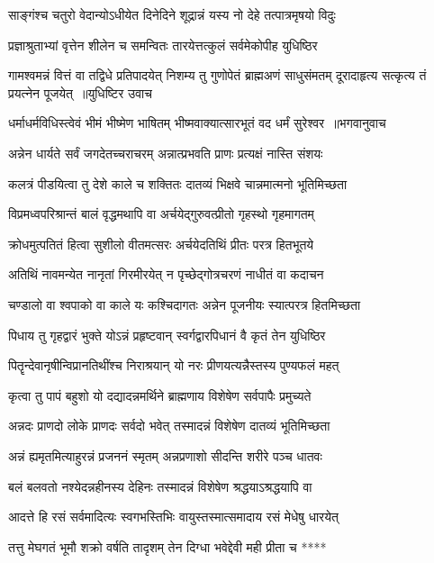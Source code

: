 \twolineshloka
{साङ्गंश्च चतुरो वेदान्योऽधीयेत दिनेदिने}
{शूद्रान्नं यस्य नो देहे तत्पात्रमृषयो विदुः}


\twolineshloka
{प्रज्ञाश्रुताभ्यां वृत्तेन शीलेन च समन्वितः}
{तारयेत्तत्कुलं सर्वमेकोपीह युधिष्ठिर}


\fourlineindentedshloka
{गामश्वमन्नं वित्तं वा तद्विधे प्रतिपादयेत्}
{निशम्य तु गुणोपेतं ब्राह्मअणं साधुसंमतम्}
{दूरादाहृत्य सत्कृत्य तं प्रयत्नेन पूजयेत् ॥युधिष्टिर उवाच}
{}


\threelineshloka
{धर्माधर्मविधिस्त्वेवं भीमं भीष्मेण भाषितम्}
{भीष्मवाक्यात्सारभूतं वद धर्मं सुरेश्वर ॥भगवानुवाच}
{}


\twolineshloka
{अन्नेन धार्यते सर्वं जगदेतच्चराचरम्}
{अन्नात्प्रभवति प्राणः प्रत्यक्षं नास्ति संशयः}


\twolineshloka
{कलत्रं पीडयित्वा तु देशे काले च शक्तितः}
{दातव्यं भिक्षवे चान्नमात्मनो भूतिमिच्छता}


\twolineshloka
{विप्रमध्वपरिश्रान्तं बालं वृद्धमथापि वा}
{अर्चयेद्गुरुवत्प्रीतो गृहस्थो गृहमागतम्}


\twolineshloka
{क्रोधमुत्पतितं हित्वा सुशीलो वीतमत्सरः}
{अर्चयेदतिथिं प्रीतः परत्र हितभूतये}


\twolineshloka
{अतिथिं नावमन्येत नानृतां गिरमीरयेत्}
{न पृच्छेद्गोत्रचरणं नाधीतं वा कदाचन}


\twolineshloka
{चण्डालो वा श्वपाको वा काले यः कश्चिदागतः}
{अन्नेन पूजनीयः स्यात्परत्र हितमिच्छता}


\twolineshloka
{पिधाय तु गृहद्वारं भुक्ते योऽन्नं प्रहृष्टवान्}
{स्वर्गद्वारपिधानं वै कृतं तेन युधिष्ठिर}


\twolineshloka
{पितॄन्देवानृषीन्विप्रानतिथींश्च निराश्रयान्}
{यो नरः प्रीणयत्यन्नैस्तस्य पुण्यफलं महत्}


\twolineshloka
{कृत्वा तु पापं बहुशो यो दद्यादन्नमर्थिने}
{ब्राह्मणाय विशेषेण सर्वपापैः प्रमुच्यते}


\twolineshloka
{अन्नदः प्राणदो लोके प्राणदः सर्वदो भवेत्}
{तस्मादन्नं विशेषेण दातव्यं भूतिमिच्छता}


\twolineshloka
{अन्नं ह्यमृतमित्याहुरन्नं प्रजननं स्मृतम्}
{अन्नप्रणाशो सीदन्ति शरीरे पञ्च धातवः}


\twolineshloka
{बलं बलवतो नश्येदन्नहीनस्य देहिनः}
{तस्मादन्नं विशेषेण श्रद्धयाऽश्रद्धयापि वा}


\twolineshloka
{आदत्ते हि रसं सर्वमादित्यः स्वगभस्तिभिः}
{वायुस्तस्मात्समादाय रसं मेधेषु धारयेत्}


\twolineshloka
{तत्तु मेघगतं भूमौ शक्रो वर्षति तादृशम्}
{तेन दिग्धा भवेद्देवी मही प्रीता च ****}


